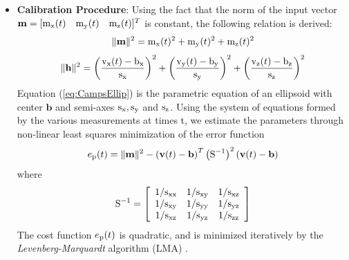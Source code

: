 \begin{itemize}
\item \textbf{Calibration Procedure}: Using the fact that the norm of the input vector $\mathbf{m}=[\mbox{m}_{\scriptsize \mbox{x}}(t)\quad \mbox{m}_{\scriptsize \mbox{y}}(t) \quad \mbox{m}_{\scriptsize \mbox{z}}(t)]^{T}$ is constant, the following relation is derived:
    \begin{equation}
    \|\mathbf{m}\|^{2}=\mbox{m}_{\scriptsize \mbox{x}}(t)^{2}+\mbox{m}_{\scriptsize \mbox{y}}(t)^{2}+\mbox{m}_{\scriptsize \mbox{z}}(t)^{2}
    \label{eq:CampsGeneral}
    \end{equation}
    \begin{equation}
    \|\mathbf{h}\|^{2}=\left(\frac{\mbox{v}_{\scriptsize \mbox{x}}(t)-\mbox{b}_{\scriptsize \mbox{x}}}{\mbox{s}_{\scriptsize \mbox{x}}}\right)^{2}+\left(\frac{\mbox{v}_{\scriptsize \mbox{y}}(t)-\mbox{b}_{\scriptsize \mbox{y}}}{\mbox{s}_{\scriptsize \mbox{y}}}\right)^{2}+\left(\frac{\mbox{v}_{\scriptsize \mbox{z}}(t)-\mbox{b}_{\scriptsize \mbox{z}}}{\mbox{s}_{\scriptsize \mbox{z}}}\right)^{2}
    \label{eq:CampsEllip}
    \end{equation}
    Equation (\ref{eq:CampsEllip}) is the parametric equation of an ellipsoid with center $\mathbf{b}$ and semi-axes $\mbox{s}_{\scriptsize \mbox{x}}, \mbox{s}_{\scriptsize \mbox{y}}$ and $\mbox{s}_{\scriptsize \mbox{z}}$. Using the system of equations formed by the various measurements at times t, we estimate the parameters through non-linear least squares minimization of the error function
    \begin{equation}
    e_{\scriptsize \mbox{p}}(t)=\|\mathbf{m}\|^{2}-\left(\mathbf{v}(t)-\mathbf{b}\right)^{T}\left(\mbox{S}^{-1}\right)^{2}\left(\mathbf{v}(t)-\mathbf{b}\right)
    \label{eq:CampsError}
    \end{equation}
    where
    \begin{equation}
    \mbox{S}^{-1}=\left[
              \begin{array}{ccc}
                1/\mbox{s}_{\scriptsize \mbox{xx}} & 1/\mbox{s}_{\scriptsize \mbox{xy}} & 1/\mbox{s}_{\scriptsize \mbox{xz}} \\
                1/\mbox{s}_{\scriptsize \mbox{xy}} & 1/\mbox{s}_{\scriptsize \mbox{yy}} & 1/\mbox{s}_{\scriptsize \mbox{yz}} \\
                1/\mbox{s}_{\scriptsize \mbox{xz}} & 1/\mbox{s}_{\scriptsize \mbox{yz}} & 1/\mbox{s}_{\scriptsize \mbox{zz}} \\
              \end{array}
            \right]
    \label{eq:CampsS}
    \end{equation}
    The cost function $e_{\scriptsize \mbox{p}}(t)$ is quadratic, and is minimized iteratively by the \emph{Le\-ven\-berg\--Mar\-quardt} algorithm (LMA) \cite{Levenberg,Marquardt}.
\end{itemize}


